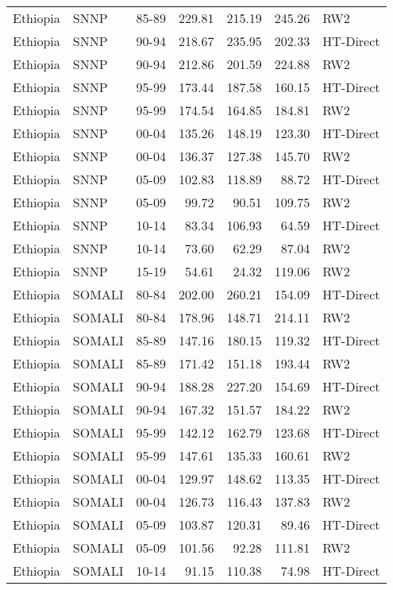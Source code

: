 \begin{longtable}{lllrrrl}
  Ethiopia & SNNP & 85-89 & 229.81 & 215.19 & 245.26 & RW2 \\ 
  Ethiopia & SNNP & 90-94 & 218.67 & 235.95 & 202.33 & HT-Direct \\ 
  Ethiopia & SNNP & 90-94 & 212.86 & 201.59 & 224.88 & RW2 \\ 
  Ethiopia & SNNP & 95-99 & 173.44 & 187.58 & 160.15 & HT-Direct \\ 
  Ethiopia & SNNP & 95-99 & 174.54 & 164.85 & 184.81 & RW2 \\ 
  Ethiopia & SNNP & 00-04 & 135.26 & 148.19 & 123.30 & HT-Direct \\ 
  Ethiopia & SNNP & 00-04 & 136.37 & 127.38 & 145.70 & RW2 \\ 
  Ethiopia & SNNP & 05-09 & 102.83 & 118.89 & 88.72 & HT-Direct \\ 
  Ethiopia & SNNP & 05-09 & 99.72 & 90.51 & 109.75 & RW2 \\ 
  Ethiopia & SNNP & 10-14 & 83.34 & 106.93 & 64.59 & HT-Direct \\ 
  Ethiopia & SNNP & 10-14 & 73.60 & 62.29 & 87.04 & RW2 \\ 
  Ethiopia & SNNP & 15-19 & 54.61 & 24.32 & 119.06 & RW2 \\ 
  Ethiopia & SOMALI & 80-84 & 202.00 & 260.21 & 154.09 & HT-Direct \\ 
  Ethiopia & SOMALI & 80-84 & 178.96 & 148.71 & 214.11 & RW2 \\ 
  Ethiopia & SOMALI & 85-89 & 147.16 & 180.15 & 119.32 & HT-Direct \\ 
  Ethiopia & SOMALI & 85-89 & 171.42 & 151.18 & 193.44 & RW2 \\ 
  Ethiopia & SOMALI & 90-94 & 188.28 & 227.20 & 154.69 & HT-Direct \\ 
  Ethiopia & SOMALI & 90-94 & 167.32 & 151.57 & 184.22 & RW2 \\ 
  Ethiopia & SOMALI & 95-99 & 142.12 & 162.79 & 123.68 & HT-Direct \\ 
  Ethiopia & SOMALI & 95-99 & 147.61 & 135.33 & 160.61 & RW2 \\ 
  Ethiopia & SOMALI & 00-04 & 129.97 & 148.62 & 113.35 & HT-Direct \\ 
  Ethiopia & SOMALI & 00-04 & 126.73 & 116.43 & 137.83 & RW2 \\ 
  Ethiopia & SOMALI & 05-09 & 103.87 & 120.31 & 89.46 & HT-Direct \\ 
  Ethiopia & SOMALI & 05-09 & 101.56 & 92.28 & 111.81 & RW2 \\ 
  Ethiopia & SOMALI & 10-14 & 91.15 & 110.38 & 74.98 & HT-Direct \\ 

\end{longtable}
